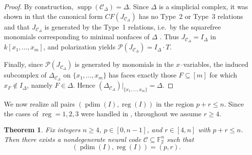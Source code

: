 \documentclass[12pt]{amsart}
\newtheorem{theorem}{Theorem}[section]
\theoremstyle{remark}
\theoremstyle{definition}
\DeclareMathOperator{\reg}{reg}
\DeclareMathOperator{\pd}{pdim}
\DeclareMathOperator{\supp}{supp}
\newcommand{\F}{\mathbb{F}}
\newcommand{\C}{\mathcal{C}}
\def\P{{\mathcal P}}
\begin{document}
\begin{proof}
By construction, $\supp(\C_\Delta)=\Delta$. Since $\Delta$ is a simplicial complex, it was shown in \cite{smb}
 that the canonical form $CF(J_{\C_\Delta})$ has no Type~2 or Type~3 relations and that $J_{\C_\Delta}$
is generated by the Type~1 relations, i.e.\ by the squarefree monomials corresponding to minimal nonfaces of
$\Delta$ \cite[Lemma~4.4]{smb}. Thus $J_{\C_\Delta}=I_\Delta$ in $k[x_1,\dots,x_m]$, and polarization yields
$\P(J_{\C_\Delta})=I_\Delta\cdot T$.

Finally, since $\P(J_{\C_\Delta})$ is generated by monomials in the $x$--variables, the induced subcomplex of
$\Delta_{\C_\Delta}$ on $\{x_1,\dots,x_m\}$ has faces exactly those $F\subseteq[m]$ for which $x_F\notin I_\Delta$,
namely $F\in\Delta$. Hence $(\Delta_{\C_\Delta})|_{\{x_1,\dots,x_m\}}=\Delta$.
\end{proof}



We now realize all pairs $(\pd (I),\reg(I))$ in the region $p+r\le n$.  Since the cases of $\reg=1,2,3$
were handled in ,  throughout we assume $r\ge 4$.


\begin{theorem}\label{thm:pr-band-realization}
Fix integers $n\geq 4$, $p\in [0, n-1]$, and $r\in [4,n]$ with $p+r\le n$.
Then there exists a nondegenerate neural code $\C\subseteq \F_2^n$ such that
\[
(\pd(I),\reg(I))=(p,r).
\]
\end{theorem}
\end{document}
